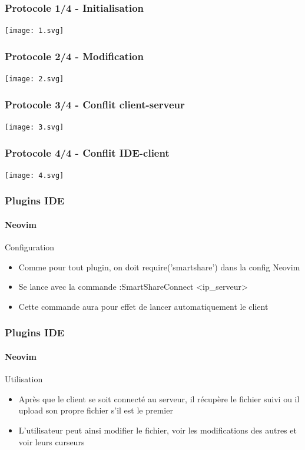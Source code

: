 \documentclass{beamer}
\begin{document}
\begin{frame}
    \frametitle{Protocole 1/4 - Initialisation}
    \texttt{[image: 1.svg]}
\end{frame}

\begin{frame}
    \frametitle{Protocole 2/4 - Modification}
    \texttt{[image: 2.svg]}
\end{frame}

\begin{frame}
    \frametitle{Protocole 3/4 - Conflit client-serveur}
    \texttt{[image: 3.svg]}
\end{frame}

\begin{frame}
    \frametitle{Protocole 4/4 - Conflit IDE-client}
    \texttt{[image: 4.svg]}
\end{frame}

\begin{frame}
    \frametitle{Plugins IDE}
    \framesubtitle{Neovim}
    \begin{block}{Configuration}
        \begin{itemize}
            \item Comme pour tout plugin, on doit require('smartshare') dans la config Neovim
            \item Se lance avec la commande :SmartShareConnect <ip\_serveur>
            \item Cette commande aura pour effet de lancer automatiquement le client
        \end{itemize}
    \end{block}
\end{frame}

\begin{frame}
    \frametitle{Plugins IDE}
    \framesubtitle{Neovim}
    \begin{block}{Utilisation}
        \begin{itemize}
            \item Après que le client se soit connecté au serveur, il récupère le fichier suivi ou il upload son propre fichier s'il est le premier
            \item L'utilisateur peut ainsi modifier le fichier, voir les modifications des autres et voir leurs curseurs
        \end{itemize}
    \end{block}
\end{frame}
\end{document}
